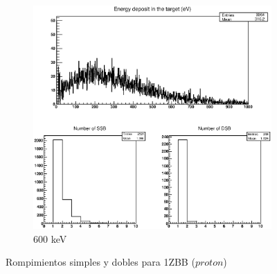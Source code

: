 \begin{figure}
\begin{subfigure}{.5\textwidth}
  \includegraphics[width=.78\linewidth]{./Figures/proton600kev.eps}
  \caption{600 keV}
  \label{fig:sub8}
\end{subfigure}
\caption{Rompimientos simples y dobles para 1ZBB ($proton$)}
\label{fig:p}
\end{figure}



